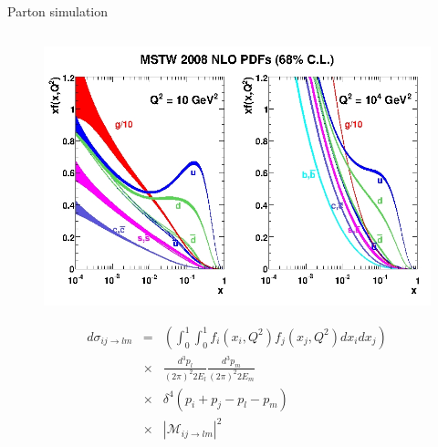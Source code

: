 \begin{frame}{Parton simulation}
\begin{columns}
\begin{column}{.50\textwidth}
\begin{figure}[!Hhtbp]
  \begin{center}
    \includegraphics[width=1.0\textwidth]{../figs/mstw2008nlo68cl_allpdfs.jpg}
  \end{center}
\end{figure}
\vspace{-.2cm}
{\tiny
\begin{eqnarray}
d\sigma_{ij\rightarrow lm} & = & \left( \int_{0}^{1}\int_{0}^{1}f_{i}(x_{i},Q^{2})f_{j}(x_{j},Q^{2})dx_{i}dx_{j} \right) \nonumber \\
  & \times & \frac{d^{3}p_{l}}{(2\pi)^{2}2E_{l}}\frac{d^{3}p_{m}}{(2\pi)^{2}2E_{m}} \nonumber \\
  & \times & \delta^{4}\left( p_{i}+p_{j}-p_{l}-p_{m} \right) \nonumber \\
  & \times & |\mathcal{M}_{ij\rightarrow lm}|^{2} \nonumber                                     
\end{eqnarray}
}%

\end{column}

\end{columns}
\end{frame}


